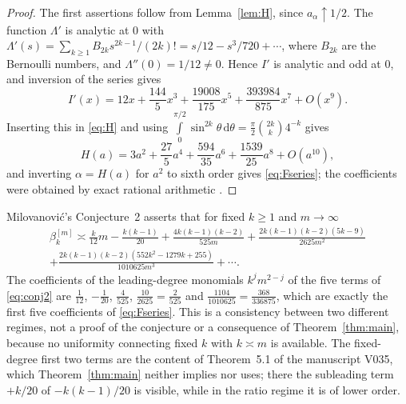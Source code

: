 \documentclass{math}
\let\TJMoriginalint\int
\renewcommand{\int}{\TJMoriginalint\limits}
\newcommand{\dd}{\,\mathrm d}
\begin{document}
\begin{proof}
The first assertions follow from Lemma~\ref{lem:H}, since $a_\alpha\uparrow1/2$. The function $\Lambda'$ is analytic at $0$ with $\Lambda'(s)=\sum_{k\ge1}B_{2k}s^{2k-1}/(2k)!=s/12-s^3/720+\cdots$, where $B_{2k}$ are the Bernoulli numbers, and $\Lambda''(0)=1/12\ne0$. Hence $I'$ is analytic and odd at $0$, and inversion of the series gives
\begin{equation}\label{eq:Iseries}
I'(x)=12x+\frac{144}5x^3+\frac{19008}{175}x^5+\frac{393984}{875}x^7+O(x^9).
\end{equation}
Inserting this in \eqref{eq:H} and using $\int_0^{\pi/2}\sin^{2k}\theta\dd\theta=\frac\pi2\binom{2k}k4^{-k}$ gives
\begin{equation}\label{eq:Hseries}
H(a)=3a^2+\frac{27}5a^4+\frac{594}{35}a^6+\frac{1539}{25}a^8+O(a^{10}),
\end{equation}
and inverting $\alpha=H(a)$ for $a^2$ to sixth order gives \eqref{eq:Fseries}; the coefficients were obtained by exact rational arithmetic \cite{alfano2026cert}.
\end{proof}

Milovanovi\'c's Conjecture~2 \cite[p.~347]{milovanovic2017} asserts that for fixed $k\ge1$ and $m\to\infty$
\begin{multline}\label{eq:conj2}
\beta_k^{[m]}\asymp\frac k{12}m-\frac{k(k-1)}{20}+\frac{4k(k-1)(k-2)}{525m}+\frac{2k(k-1)(k-2)(5k-9)}{2625m^2}\\
+\frac{2k(k-1)(k-2)(552k^2-1279k+255)}{1010625m^3}+\cdots .
\end{multline}
The coefficients of the leading-degree monomials $k^jm^{2-j}$ of the five terms of \eqref{eq:conj2} are $\frac1{12}$, $-\frac1{20}$, $\frac4{525}$, $\frac{10}{2625}=\frac2{525}$ and $\frac{1104}{1010625}=\frac{368}{336875}$, which are exactly the first five coefficients of \eqref{eq:Fseries}. This is a consistency between two different regimes, not a proof of the conjecture or a consequence of Theorem~\ref{thm:main}, because no uniformity connecting fixed $k$ with $k\asymp m$ is available. The fixed-degree first two terms are the content of Theorem~5.1 of the manuscript V035, which Theorem~\ref{thm:main} neither implies nor uses; there the subleading term $+k/20$ of $-k(k-1)/20$ is visible, while in the ratio regime it is of lower order.
\end{document}
